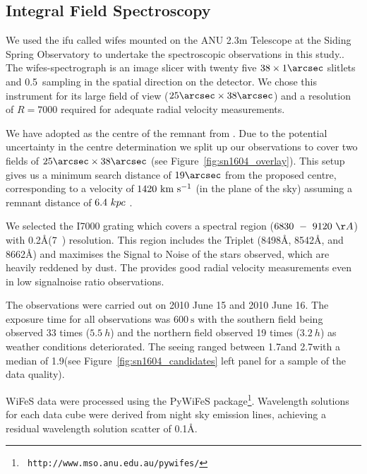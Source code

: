 \documentclass[preprint2]{aastex}
\begin{document}
\subsection{Integral Field Spectroscopy}
We used the \gls{ifu} called \gls{wifes} mounted on the ANU 2.3m Telescope at the Siding Spring Observatory  to undertake the spectroscopic observations in this study.. The \gls{wifes}-spectrograph is an image slicer with twenty five $38\times 1\arcsec$ slitlets and 0.5\arcsec\ sampling in the spatial direction on the detector. We chose this instrument for its large field of view ($25\arcsec\times38\arcsec$) and a resolution of $R=7000$ required for adequate radial velocity measurements. 

We have adopted   as the centre of the remnant from \citet{2008ApJ...689..225K}. Due to the potential uncertainty in the centre determination \citep[for a more detailed discussion about the difficulty of centre determination see Section~2.2 in][]{2012ApJ...759....7K} we split up our observations to cover two fields of $25\arcsec\times38\arcsec$ (see Figure~\ref{fig:sn1604_overlay}). This setup gives us a minimum search distance of $19\arcsec$ from the proposed centre, corresponding to a velocity of $1420~\textrm{km}~\textrm{s}^{-1}$ (in the plane of the sky) assuming a remnant distance of $6.4~kpc$ \citep{2012A&A...537A.139C}. 



We selected the I7000 grating which covers a spectral region  ($6830~-~9120~\AA$) with 0.2\AA (7~\kms) resolution. This region includes the  Triplet (8498\AA, 8542\AA, and 8662\AA) and maximises the Signal to Noise of the stars observed, which are heavily reddened by dust. The  provides good radial velocity measurements even in low \gls{signalnoise} ratio observations.

The observations were carried out  on 2010 June 15 and 2010 June 16. The exposure time for all observations was $600~\textrm{s}$ with the southern field being observed 33 times ($5.5~h$) and the northern field observed 19 times ($3.2~h$) as weather conditions deteriorated. 
The seeing ranged between 1.7\arcsec and 2.7\arcsec with a median of 1.9\arcsec (see Figure~\ref{fig:sn1604_candidates} left panel for a sample of the data quality). 




WiFeS data were processed using the PyWiFeS package\footnote[1]{{\tt
http://www.mso.anu.edu.au/pywifes/}}.  Wavelength solutions for each
data cube were derived from night sky emission lines, achieving a
residual wavelength solution scatter of 0.1\AA.
\end{document}

